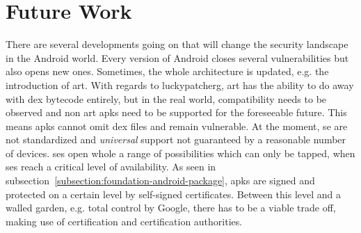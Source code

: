 \section{Future Work}\label{section:conclusion-future}
There are several developments going on that will change the security landscape in the Android world.
\newline
Every version of Android closes several vulnerabilities but also opens new ones.
Sometimes, the whole architecture is updated, e.g. the introduction of \gls{art}.
With regards to \gls{luckypatcherg}, \gls{art} has the ability to do away with dex bytecode entirely, but in the real world, compatibility needs to be observed and non \gls{art} \gls{apk}s need to be supported for the foreseeable future.
This means \gls{apk}s cannot omit \gls{dex} files and remain vulnerable.
\newline
At the moment, \gls{se} are not standardized and \textit{universal} support not guaranteed by a reasonable number of devices.
\gls{se}s open whole a range of possibilities which can only be tapped, when \gls{se}s reach a critical level of availability.
\newline
As seen in subsection~\ref{subsection:foundation-android-package}, \gls{apk}s are signed and protected on a certain level by self-signed certificates.
Between this level and a walled garden, e.g. total control by Google, there has to be a viable trade off, making use of certification and certification authorities.
